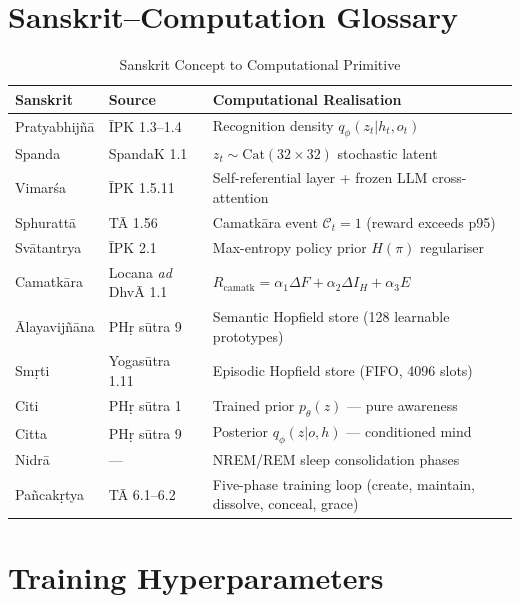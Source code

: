\documentclass[journal,onecolumn,11pt]{IEEEtran}
\begin{document}
\section{Sanskrit--Computation Glossary}\label{app:glossary}

\begin{table}[h]
  \caption{Sanskrit Concept to Computational Primitive}
  \label{tab:glossary}
  \centering\small
  \begin{tabular}{llp{4.5cm}}
    \toprule
    Sanskrit & Source & Computational Realisation \\
    \midrule
    Pratyabhijñā & ĪPK 1.3--1.4 & Recognition density $q_\phi(z_t|h_t,o_t)$ \\
    Spanda & SpandaK 1.1 & $z_t \sim \text{Cat}(32\!\times\!32)$ stochastic latent \\
    Vimarśa & ĪPK 1.5.11 & Self-referential layer + frozen LLM cross-attention \\
    Sphurattā & TĀ 1.56 & Camatkāra event $\mathcal{C}_t = 1$ (reward exceeds p95) \\
    Svātantrya & ĪPK 2.1 & Max-entropy policy prior $H(\pi)$ regulariser \\
    Camatkāra & Locana \emph{ad} DhvĀ 1.1 & $R_{\text{camatk}} = \alpha_1\Delta F + \alpha_2\Delta I_H + \alpha_3 E$ \\
    Ālayavijñāna & PHṛ sūtra 9 & Semantic Hopfield store (128 learnable prototypes) \\
    Smṛti & Yogasūtra 1.11 & Episodic Hopfield store (FIFO, 4096 slots) \\
    Citi & PHṛ sūtra 1 & Trained prior $p_\theta(z)$ — pure awareness \\
    Citta & PHṛ sūtra 9 & Posterior $q_\phi(z|o,h)$ — conditioned mind \\
    Nidrā & — & NREM/REM sleep consolidation phases \\
    Pañcakṛtya & TĀ 6.1--6.2 & Five-phase training loop (create, maintain, dissolve, conceal, grace) \\
    \bottomrule
  \end{tabular}
\end{table}

\section{Training Hyperparameters}\label{app:hyp}
\end{document}
